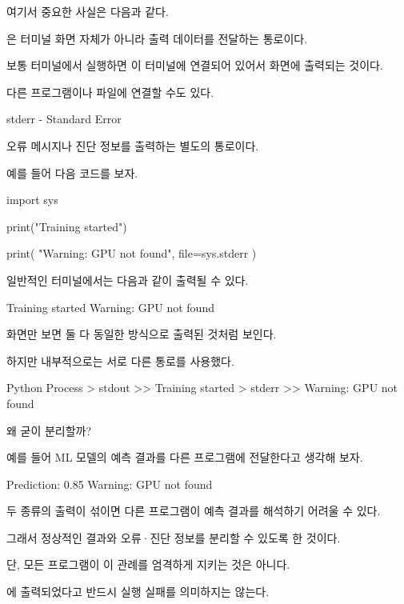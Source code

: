 여기서 중요한 사실은 다음과 같다.

은 터미널 화면 자체가 아니라 출력 데이터를 전달하는 통로이다.

보통 터미널에서 실행하면 이 터미널에 연결되어 있어서 화면에 출력되는 것이다.

다른 프로그램이나 파일에 연결할 수도 있다.

\begin{dhknote}
\begin{dhksmry}[centered]
stderr - Standard Error
\end{dhksmry}
\end{dhknote}

오류 메시지나 진단 정보를 출력하는 별도의 통로이다.

예를 들어 다음 코드를 보자.

\begin{dhkcode}
import sys

print("Training started")

print(
    "Warning: GPU not found",
    file=sys.stderr
)
\end{dhkcode}

일반적인 터미널에서는 다음과 같이 출력될 수 있다.

\begin{dhkzsh}
Training started
Warning: GPU not found
\end{dhkzsh}

화면만 보면 둘 다 동일한 방식으로 출력된 것처럼 보인다.

하지만 내부적으로는 서로 다른 통로를 사용했다.

\begin{dhkdir}
Python Process
> stdout
>> Training started
> stderr
>> Warning: GPU not found
\end{dhkdir}

왜 굳이 분리할까?

예를 들어 ML 모델의 예측 결과를 다른 프로그램에 전달한다고 생각해 보자.

\begin{dhkzsh}
Prediction: 0.85
Warning: GPU not found
\end{dhkzsh}

두 종류의 출력이 섞이면 다른 프로그램이 예측 결과를 해석하기 어려울 수 있다.

그래서 정상적인 결과와 오류·진단 정보를 분리할 수 있도록 한 것이다.

단, 모든 프로그램이 이 관례를 엄격하게 지키는 것은 아니다.

에 출력되었다고 반드시 실행 실패를 의미하지는 않는다.

